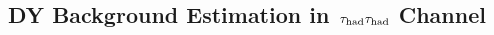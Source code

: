 \subsection{\texorpdfstring{DY Background Estimation in $\,\tau_{\rm had}\tau_{\rm had}$ Channel}{DY Background Estimation in tau-tau Channel}}
